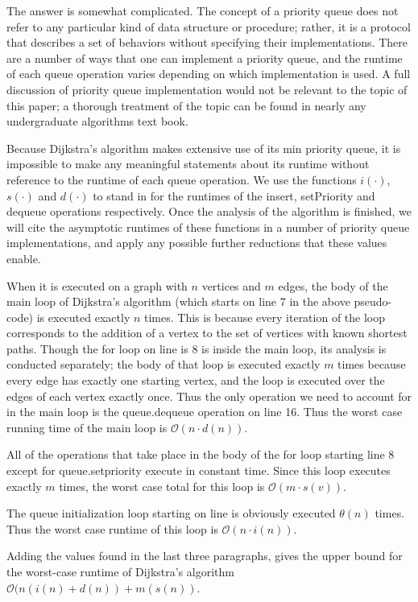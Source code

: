 \documentclass[12pt,twoside]{reedthesis}
\begin{document}
The answer is somewhat complicated. The concept of a priority queue does not refer to any particular kind of data structure or procedure; rather, it is a protocol that describes a set of behaviors without specifying their implementations. There are a number of ways that one can implement a priority queue, and the runtime of each queue operation varies depending on which implementation is used. A full discussion of priority queue implementation would not be relevant to the topic of this paper; a thorough treatment of the topic can be found in nearly any undergraduate algorithms text book.

Because Dijkstra's algorithm makes extensive use of its min priority queue, it is impossible to make any meaningful statements about its runtime without reference to the runtime of each queue operation. We use the functions $i(\cdot)$, $s(\cdot)$ and $d(\cdot)$ to stand in for the runtimes of the insert, setPriority and dequeue operations respectively. Once the analysis of the algorithm is finished, we will cite the asymptotic runtimes of these functions in a number of priority queue implementations, and apply any possible further reductions that these values enable.

When it is executed on a graph with $n$ vertices and $m$ edges, the body of the main loop of Dijkstra's algorithm (which starts on line 7 in the above pseudo-code) is executed exactly $n$ times. This is because every iteration of the loop corresponds to the addition of a vertex to the set of vertices with known shortest paths. Though the for loop on line is 8 is inside the main loop, its analysis is conducted separately; the body of that loop is executed exactly $m$ times because every edge has exactly one starting vertex, and the loop is executed over the edges of each vertex exactly once. Thus the only operation we need to account for in the main loop is the queue.dequeue operation on line 16. Thus the worst case running time of the main loop is $\mathcal{O}(n\cdot d(n))$.

All of the operations that take place in the body of the for loop starting line 8 except for queue.setpriority execute in constant time. Since this loop executes exactly $m$ times, the worst case total for this loop is $\mathcal{O}(m \cdot s(v))$.

The queue initialization loop starting on line is obviously executed $\theta(n)$ times. Thus the worst case runtime of this loop is $\mathcal{O}(n \cdot i(n))$. 

Adding the values found in the last three paragraphs, gives the upper bound for the worst-case runtime of Dijkstra's algorithm $\mathcal{O}(n(i(n) + d(n)) + m(s(n))$.
\end{document}
